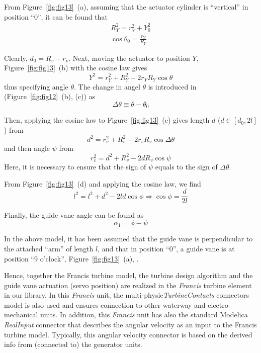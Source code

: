 \documentclass[%
]{USN-PhD}
\begin{document}
From Figure~\ref{fig:fig13}~(a), assuming that the actuator cylinder is ``vertical'' in position ``0'', it can be found that
\begin{equation}
\begin{array}{c}
{R}_Y^2=r_Y^2+Y_0^2 \\
\cos\theta_0=\frac{r_Y}{R_Y}
\end{array}
\end{equation}

Clearly, $d_0=R_v-r_v$. Next, moving the actuator to position $Y$, Figure~\ref{fig:fig13}~(b) with the cosine law gives
\begin{equation}
Y^2=r_Y^2+R_Y^2-2r_YR_Y\cos\theta
\end{equation}
thus specifying angle $\theta$. The change in angel $\theta$ is introduced in (Figure~\ref{fig:fig12}~(b), (c)) as
\begin{equation}
\Delta\theta\equiv\theta-\theta_0
\end{equation}

Then, applying the cosine law to Figure~\ref{fig:fig13}~(c) gives length $d$ ($d\in[d_0,2l]$) from
\begin{equation}
d^2=r_v^2+R_v^2-2r_vR_v\cos\Delta\theta
\end{equation}
and then angle $\psi$ from
\begin{equation}
r_v^2=d^2+R_v^2-2dR_v\cos\psi
\end{equation}
Here, it is necessary to ensure that the sign of $\psi$ equals to the sign of $\Delta\theta$.

From Figure~\ref{fig:fig13}~(d) and applying the cosine law, we find
\begin{equation}
l^2=l^2+d^2-2ld\cos\phi\Rightarrow\cos\phi=\frac{d}{2l}
\end{equation}

Finally, the guide vane angle can be found as
\begin{equation}
\alpha_1=\phi-\psi
\end{equation}

In the above model, it has been assumed that the guide vane is perpendicular to the attached ``arm'' of length $l$, and that in position ``0'', a guide vane is at position ``9 o'clock'', Figure~\ref{fig:fig13}~(a), \cite{LieL:18}.

Hence, together the Francis turbine model, the turbine design algorithm and the guide vane actuation (servo position) are realized in the \emph{Francis} turbine element in our library.  In this \emph{Francis} unit, the multi-physic\emph{TurbineContacts} connectors model is also used and ensures connection to other waterway and electro-mechanical units. In addition, this \emph{Francis} unit has also the standard Modelica \emph{RealInput} connector that describes the angular velocity as an input to the Francis turbine model. Typically, this angular velocity connector is based on the derived info from (connected to) the generator units.
\end{document}
